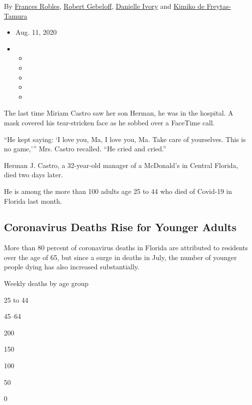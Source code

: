 By \href{https://www.nytimes3xbfgragh.onion/by/frances-robles}{Frances
Robles},
\href{https://www.nytimes3xbfgragh.onion/by/robert-gebeloff}{Robert
Gebeloff},
\href{https://www.nytimes3xbfgragh.onion/by/danielle-ivory}{Danielle
Ivory} and
\href{https://www.nytimes3xbfgragh.onion/by/kimiko-de-freytas-tamura}{Kimiko
de Freytas-Tamura}

\begin{itemize}
\item
  Aug. 11, 2020
\item
  \begin{itemize}
  \item
  \item
  \item
  \item
  \item
  \end{itemize}
\end{itemize}

The last time Miriam Castro saw her son Herman, he was in the hospital.
A mask covered his tear-stricken face as he sobbed over a FaceTime call.

``He kept saying: `I love you, Ma, I love you, Ma. Take care of
yourselves. This is no game,''' Mrs. Castro recalled. ``He cried and
cried.''

Herman J. Castro, a 32-year-old manager of a McDonald's in Central
Florida, died two days later.

He is among the more than 100 adults age 25 to 44 who died of Covid-19
in Florida last month.

\hypertarget{coronavirus-deaths-rise-for-younger-adults}{%
\subsection{Coronavirus Deaths Rise for Younger
Adults}\label{coronavirus-deaths-rise-for-younger-adults}}

More than 80 percent of coronavirus deaths in Florida are attributed to
residents over the age of 65, but since a surge in deaths in July, the
number of younger people dying has also increased substantially.

Weekly deaths by age group

25 to 44

45--64

200

150

100

50

0

